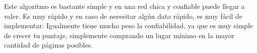 Este algoritmo es bastante simple y en una red chica y confiable puede llegar a valer. Es muy rápido y en caso de necesitar algún dato rápido, es muy fácil de implementar. Igualmente tiene mucho peso la confiabilidad, ya que es muy simple de crecer tu puntaje, simplemente comprando un lugar mínimo en la mayor cantidad de páginas posibles.










